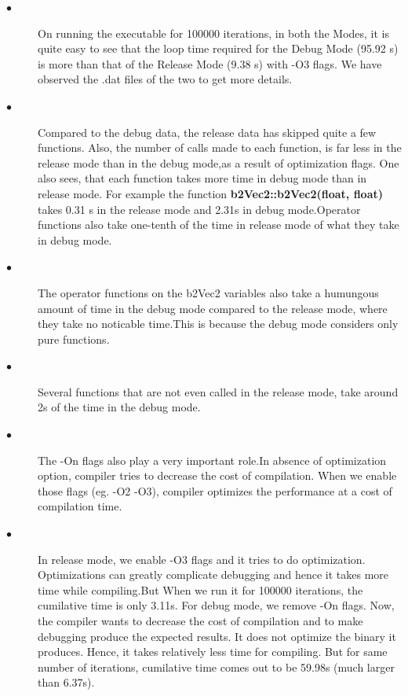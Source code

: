 \documentclass[11pt]{article}
\begin{document}
\begin{description}
\item[$\bullet$ ] On running the executable for 100000 iterations, in both the Modes, it is quite easy to see that the loop time required for the 
Debug Mode (95.92 s)
 is more than that of the Release Mode (9.38 s) with -O3 flags. We have observed the .dat files of the two to get more details.
\newline
\item[$\bullet$ ]
 Compared to the debug data, the release data has skipped quite a few functions. Also, the number of calls made to each function,
   is far less in the release mode than in the debug mode,as a result of optimization flags. One also sees, that each function 
   takes more
   time in debug mode than in release mode. For example the function {\bf b2Vec2::b2Vec2(float, float)} takes 0.31 s in the 
   release mode and 2.31s in debug mode.Operator functions also take one-tenth of the time in release mode of what they take in 
   debug mode.
\newline
\item[$\bullet$ ]
The operator functions on the b2Vec2 variables also take a humungous amount of time in the debug mode compared to the release mode, where they take no noticable time.This is because the debug mode considers only pure functions.
   \newline 
\item[$\bullet$ ]
Several functions that are not even called in the release mode, take around 2s of the time in the debug mode.
   \newline 
\item[$\bullet$ ]
The -On flags also play a very important role.In absence of optimization 
   option, compiler tries to decrease the cost of compilation. When we enable those flags (eg. -O2 -O3), compiler optimizes the 
   performance at a cost of compilation time.\newline
\item[$\bullet$ ]
In release mode, we enable -O3 flags and it tries to do optimization. Optimizations can greatly complicate debugging and hence it takes
 more time while compiling.But When we run it for 100000 iterations, the cumilative time is only 3.11s. For debug mode, we remove -On flags. Now, the compiler wants to decrease the cost of compilation and to make debugging produce the expected results. It does not optimize the binary it produces. Hence, it takes relatively less time for compiling. But for same number of iterations, cumilative time comes out to be 59.98s (much larger than 6.37s). 

\end{description}
\end{document}
